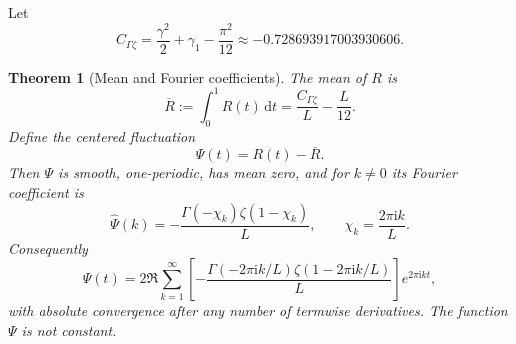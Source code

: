 \documentclass[11pt,oneside]{article}
\newtheorem{theorem}{Theorem}[section]
\theoremstyle{definition}
\theoremstyle{remark}
\newcommand{\dd}{\,\mathrm d}
\newcommand{\ii}{\mathrm i}
\newcommand{\Ltwo}{L}
\newcommand{\PsiPer}{\Psi}
\begin{document}
Let
\begin{equation}\label{eq:C-gammazeta}
  C_{\Gamma\zeta}=\frac{\gamma^2}{2}+\gamma_1-\frac{\pi^2}{12}
  \approx-0.728693917003930606.
\end{equation}

\begin{theorem}[Mean and Fourier coefficients]\label{thm:periodic-Fourier}
The mean of $R$ is
\begin{equation}\label{eq:R-mean}
  \overline R:=\int_0^1R(t)\dd t
  =\frac{C_{\Gamma\zeta}}{\Ltwo}-\frac{\Ltwo}{12}.
\end{equation}
Define the centered fluctuation
\begin{equation}\label{eq:Psi-def}
  \PsiPer(t)=R(t)-\overline R.
\end{equation}
Then $\PsiPer$ is smooth, one-periodic, has mean zero, and for $k\ne0$ its Fourier
coefficient is
\begin{equation}\label{eq:Psi-Fourier-coeff}
 \widehat{\PsiPer}(k)
 =-\frac{\Gamma(-\chi_k)\zeta(1-\chi_k)}{\Ltwo},
 \qquad
 \chi_k=\frac{2\pi\ii k}{\Ltwo}.
\end{equation}
Consequently
\begin{equation}\label{eq:Psi-Fourier-series}
 \PsiPer(t)=2\Re\sum_{k=1}^{\infty}
 \left[-\frac{\Gamma(-2\pi\ii k/\Ltwo)
 \zeta(1-2\pi\ii k/\Ltwo)}{\Ltwo}\right]e^{2\pi\ii kt},
\end{equation}
with absolute convergence after any number of termwise derivatives.
The function $\PsiPer$ is not constant.
\end{theorem}
\end{document}
